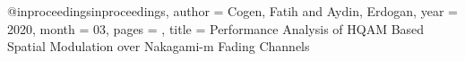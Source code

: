 @inproceedings{inproceedings,
author = {Cogen, Fatih and Aydin, Erdogan},
year = {2020},
month = {03},
pages = {},
title = {Performance Analysis of HQAM Based Spatial Modulation over Nakagami-m Fading Channels}
}